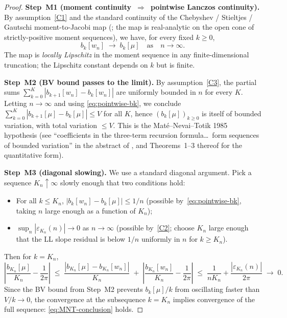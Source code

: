 \documentclass[11pt]{article}
\theoremstyle{definition}
\begin{document}
\begin{proof}
\textbf{Step~M1 (moment continuity~$\Rightarrow$~pointwise Lanczos
continuity).}  By assumption~\ref{C1} and the standard continuity
of the Chebyshev / Stieltjes / Gautschi moment-to-Jacobi map
(\cite[Ch.~2, \S 2.1]{Gautschi2004}; the map is real-analytic on the
open cone of strictly-positive moment sequences), we have, for every
fixed $k\ge 0$,
\begin{equation}\label{eq:pointwise-bk}
b_k[w_n]\;\longrightarrow\;b_k[\mu]\quad\text{as}\quad n\to\infty.
\end{equation}
The map is \emph{locally Lipschitz} in the moment sequence in any
finite-dimensional truncation; the Lipschitz constant depends on $k$
but is finite.

\textbf{Step~M2 (BV bound passes to the limit).}  By
assumption~\ref{C3}, the partial sums $\sum_{k=0}^{K} |b_{k+1}[w_n]-
b_k[w_n]|$ are uniformly bounded in $n$ for every $K$.  Letting
$n\to\infty$ and using \eqref{eq:pointwise-bk}, we conclude
$\sum_{k=0}^{K}|b_{k+1}[\mu]-b_k[\mu]|\le V$ for all $K$, hence
$(b_k[\mu])_{k\ge 0}$ is itself of bounded variation, with total
variation $\le V$.  This is the Mat\'e--Nevai--Totik 1985
\cite{MNT1985} hypothesis (see ``coefficients in the three-term
recursion formula\ldots\ form sequences of bounded variation'' in the
abstract of \cite{MNT1985}, and Theorems~1--3 thereof for the
quantitative form).

\textbf{Step~M3 (diagonal slowing).}  We use a standard diagonal
argument.  Pick a sequence $K_n\uparrow\infty$ slowly enough that two
conditions hold:
\begin{itemize}
\item For all $k\le K_n$, $|b_k[w_n]-b_k[\mu]|\le 1/n$
   (possible by~\eqref{eq:pointwise-bk}, taking $n$ large enough as a
   function of $K_n$);
\item $\sup_n |\varepsilon_{K_n}(n)| \to 0$ as $n\to\infty$
   (possible by~\ref{C2}; choose $K_n$ large enough that the LL slope
   residual is below $1/n$ uniformly in $n$ for $k\ge K_n$).
\end{itemize}
Then for $k=K_n$,
\begin{equation*}
\left|\frac{b_{K_n}[\mu]}{K_n}-\frac{1}{2\pi}\right|
\;\le\;\frac{|b_{K_n}[\mu]-b_{K_n}[w_n]|}{K_n}
\;+\;\left|\frac{b_{K_n}[w_n]}{K_n}-\frac{1}{2\pi}\right|
\;\le\;\frac{1}{nK_n}+\frac{|\varepsilon_{K_n}(n)|}{2\pi}\;\to\;0.
\end{equation*}
Since the BV bound from Step~M2 prevents $b_k[\mu]/k$ from oscillating
faster than $V/k\to 0$, the convergence at the subsequence $k=K_n$
implies convergence of the full sequence:
\eqref{eq:MNT-conclusion} holds.
\end{proof}
\end{document}

